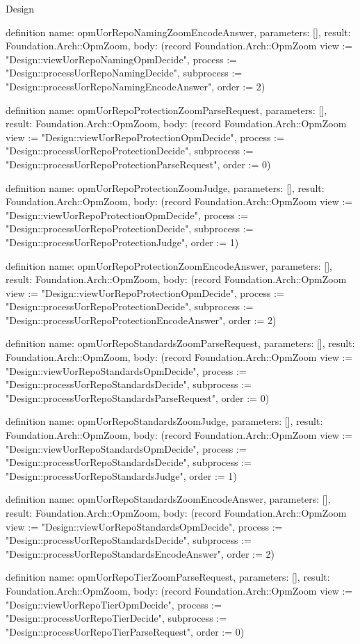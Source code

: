\begin{lexlean}{Design}
\begin{semanticmodule}
definition{
  name: opmUorRepoNamingZoomEncodeAnswer,
  parameters: [],
  result: Foundation.Arch::OpmZoom,
  body: (record Foundation.Arch::OpmZoom {view := "Design::viewUorRepoNamingOpmDecide", process := "Design::processUorRepoNamingDecide", subprocess := "Design::processUorRepoNamingEncodeAnswer", order := 2})
}

definition{
  name: opmUorRepoProtectionZoomParseRequest,
  parameters: [],
  result: Foundation.Arch::OpmZoom,
  body: (record Foundation.Arch::OpmZoom {view := "Design::viewUorRepoProtectionOpmDecide", process := "Design::processUorRepoProtectionDecide", subprocess := "Design::processUorRepoProtectionParseRequest", order := 0})
}

definition{
  name: opmUorRepoProtectionZoomJudge,
  parameters: [],
  result: Foundation.Arch::OpmZoom,
  body: (record Foundation.Arch::OpmZoom {view := "Design::viewUorRepoProtectionOpmDecide", process := "Design::processUorRepoProtectionDecide", subprocess := "Design::processUorRepoProtectionJudge", order := 1})
}

definition{
  name: opmUorRepoProtectionZoomEncodeAnswer,
  parameters: [],
  result: Foundation.Arch::OpmZoom,
  body: (record Foundation.Arch::OpmZoom {view := "Design::viewUorRepoProtectionOpmDecide", process := "Design::processUorRepoProtectionDecide", subprocess := "Design::processUorRepoProtectionEncodeAnswer", order := 2})
}

definition{
  name: opmUorRepoStandardsZoomParseRequest,
  parameters: [],
  result: Foundation.Arch::OpmZoom,
  body: (record Foundation.Arch::OpmZoom {view := "Design::viewUorRepoStandardsOpmDecide", process := "Design::processUorRepoStandardsDecide", subprocess := "Design::processUorRepoStandardsParseRequest", order := 0})
}

definition{
  name: opmUorRepoStandardsZoomJudge,
  parameters: [],
  result: Foundation.Arch::OpmZoom,
  body: (record Foundation.Arch::OpmZoom {view := "Design::viewUorRepoStandardsOpmDecide", process := "Design::processUorRepoStandardsDecide", subprocess := "Design::processUorRepoStandardsJudge", order := 1})
}

definition{
  name: opmUorRepoStandardsZoomEncodeAnswer,
  parameters: [],
  result: Foundation.Arch::OpmZoom,
  body: (record Foundation.Arch::OpmZoom {view := "Design::viewUorRepoStandardsOpmDecide", process := "Design::processUorRepoStandardsDecide", subprocess := "Design::processUorRepoStandardsEncodeAnswer", order := 2})
}

definition{
  name: opmUorRepoTierZoomParseRequest,
  parameters: [],
  result: Foundation.Arch::OpmZoom,
  body: (record Foundation.Arch::OpmZoom {view := "Design::viewUorRepoTierOpmDecide", process := "Design::processUorRepoTierDecide", subprocess := "Design::processUorRepoTierParseRequest", order := 0})
}


\end{semanticmodule}
\end{lexlean}
